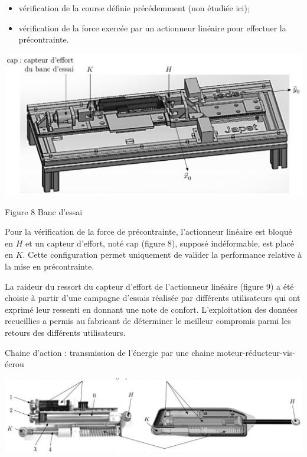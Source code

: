 \documentclass[10pt]{article}
\begin{document}
\begin{itemize}
  \item vérification de la course définie précédemment (non étudiée ici);
  \item vérification de la force exercée par un actionneur linéaire pour effectuer la précontrainte.
\end{itemize}

\begin{center}
\includegraphics[max width=\textwidth]{2024_03_20_0c3cf888f6e04b1986bcg-06(1)}
\end{center}

Figure 8 Banc d'essai

Pour la vérification de la force de précontrainte, l'actionneur linéaire est bloqué en $H$ et un capteur d'effort, noté cap (figure 8), supposé indéformable, est placé en $K$. Cette configuration permet uniquement de valider la performance relative à la mise en précontrainte.

La raideur du ressort du capteur d'effort de l'actionneur linéaire (figure 9) a été choisie à partir d'une campagne d'essais réalisée par différents utilisateurs qui ont exprimé leur ressenti en donnant une note de confort. L'exploitation des données recueillies a permis au fabricant de déterminer le meilleur compromis parmi les retours des différents utilisateurs.

Chaine d'action : transmission de l'énergie par une chaine moteur-réducteur-vis-écrou

\begin{center}
\includegraphics[max width=\textwidth]{2024_03_20_0c3cf888f6e04b1986bcg-06}
\end{center}
\end{document}
